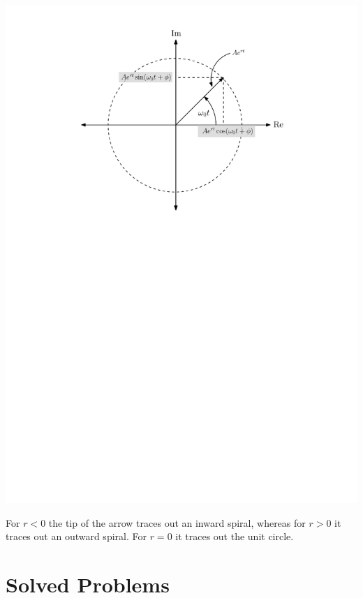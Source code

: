 \begin{center}
 \includegraphics[scale=0.7]{graphics/CT_complexsinusoid_visual}
\end{center}

For $r < 0$ the tip of the arrow traces out an inward spiral, whereas for $r > 0$ it traces out an outward spiral. For $r = 0$ it traces out the unit circle.

\section{Solved Problems}

